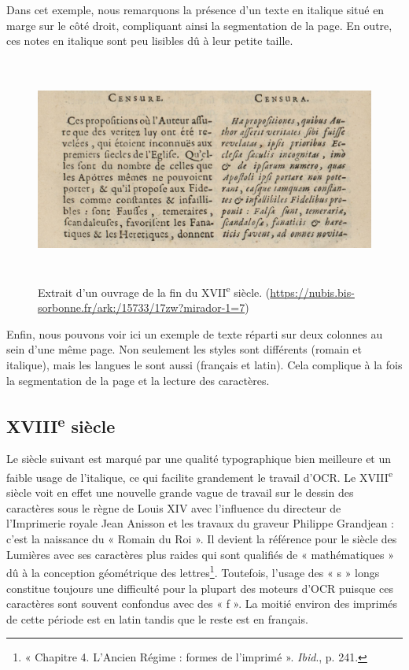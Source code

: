 \documentclass[a4paper,12pt,twoside]{book}
\begin{document}
Dans cet exemple, nous remarquons la présence d'un texte en italique situé en marge sur le côté droit, compliquant ainsi la
segmentation de la page. En outre, ces notes en italique sont peu lisibles dû à leur petite taille. \\


\begin{figure} [H]
	\includegraphics[width=6.13056in,height=2.89236in]{vertopal_157ae480aa4a4b07be198b586a812241/media/image9.png}
	\caption{Extrait d'un ouvrage de la fin du XVII\textsuperscript{e}
		siècle.
		(\url{https://nubis.bis-sorbonne.fr/ark:/15733/17zw?mirador-1=7})}
\end{figure}

Enfin, nous pouvons voir ici un exemple de texte réparti sur deux colonnes au sein d'une même page. Non seulement les styles sont différents (romain et italique), mais les langues le sont aussi (français et latin). Cela complique à la fois la segmentation de la page et la lecture des caractères. 

\subsection{XVIII\textsuperscript{e} siècle}

Le siècle suivant est marqué par une qualité typographique bien
meilleure et un faible usage de l'italique, ce qui facilite grandement
le travail d'OCR. Le XVIII\textsuperscript{e} siècle voit en effet une nouvelle grande vague de travail sur le dessin des caractères sous le règne de Louis XIV avec l'influence du directeur de l'Imprimerie royale Jean Anisson et les travaux du graveur Philippe Grandjean : c'est la naissance du « Romain du Roi ». Il devient la référence pour le siècle des Lumières avec ses caractères plus raides qui sont qualifiés de « mathématiques » dû à la conception géométrique des lettres\footnote{« Chapitre 4. L'Ancien Régime : formes de l'imprimé ». \emph{Ibid}., p. 241.}. Toutefois, l'usage des « s » longs constitue toujours
une difficulté pour la plupart des moteurs d'OCR puisque ces caractères
sont souvent confondus avec des « f ». La moitié environ des imprimés de
cette période est en latin tandis que le reste est en français.
\end{document}
